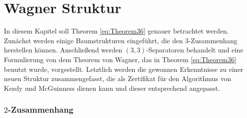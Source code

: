 \chapter{Wagner Struktur}
\label{cha:wagnerstruktur}

In diesem Kapitel soll Theorem \ref{eq:Theorem36} genauer betrachtet werden.
Zunächst werden einige Baumstrukturen eingeführt, die den $3$-Zusammenhang herstellen können.
Anschließend werden $(3, 3)$-Separatoren behandelt und eine Formulierung von dem Theorem von Wagner, das in Theorem \ref{eq:Theorem36} benutzt wurde, vorgestellt.
Letztlich werden die gewonnen Erkenntnisse zu einer neuen Struktur zusammengefasst, die als Zertifikat für den Algorithmus von Kezdy und McGuinness dienen kann und dieser entsprechend angepasst.

\subsection{$2$-Zusammenhang}


